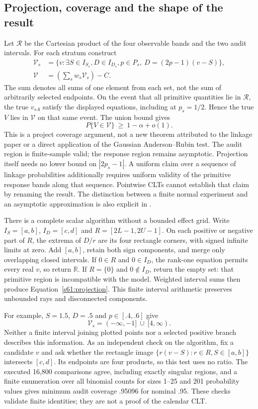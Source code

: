 \subsection{Projection, coverage and the shape of the result}
Let $\mathcal R$ be the Cartesian product of the four observable bands and
the two audit intervals. For each stratum construct
\begin{align}
 \mathcal V_s&=\{v:\exists S\in I_{S_s},D\in I_{D_s},p\in P_s,
                         \ D=(2p-1)(v-S)\},\nonumber\\
 \mathcal V&=\left(\sum_s w_s\mathcal V_s\right)-C.
 \label{s61:projection}
\end{align}
The sum denotes all sums of one element from each set, not the sum of
arbitrarily selected endpoints. On the event that all primitive quantities
lie in $\mathcal R$, the true $v_{sA}$ satisfy the displayed equations,
including at $p_s=1/2$. Hence the true $V$ lies in $\mathcal V$ on that
same event. The union bound gives
\[
 P\{V\in\mathcal V\}\ \ge\ 1-\alpha+o(1).
\]
This is a project coverage argument, not a new theorem attributed to the
linkage paper or a direct application of the Gaussian Anderson--Rubin test.
The audit region is finite-sample valid; the response region remains
asymptotic. Projection itself needs no lower bound on $|2p_s-1|$.
A uniform claim over a sequence of linkage probabilities additionally
requires uniform validity of the primitive response bands along that
sequence. Pointwise CLTs cannot establish that claim by renaming the result.
The distinction between a finite normal experiment and an asymptotic
approximation is also explicit in
\citet[Section 2.5, equations (9)--(11)]{rambachan2023}.

There is a complete scalar algorithm without a bounded effect grid.
Write $I_S=[a,b]$, $I_D=[c,d]$ and
$R=[2L-1,2U-1]$. On each positive or negative part of $R$,
the extrema of $D/r$ are its four rectangle corners, with signed infinite
limits at zero. Add $[a,b]$, retain both sign components, and merge only
overlapping closed intervals. If $0\in R$ and $0\in I_D$, the rank-one
equation permits every real $v$, so return $\mathbb R$. If $R=\{0\}$
and $0\notin I_D$, return the empty set: that primitive region is
incompatible with the model. Weighted interval sums then produce
Equation~\eqref{s61:projection}. This finite interval arithmetic preserves
unbounded rays and disconnected components.

For example, $S=1.5$, $D=.5$ and $p\in[.4,.6]$ give
\[
 \mathcal V_s=(-\infty,-1]\ \cup\ [4,\infty).
\]
Neither a finite interval joining plotted points nor a selected positive
branch describes this information. As an independent check on the algorithm,
fix a candidate $v$ and ask whether the rectangle image
$\{r(v-S):r\in R,S\in[a,b]\}$ intersects $[c,d]$.
Its endpoints are four products, so this test uses no ratio. The executed
16,800 comparisons agree, including exactly singular regions, and a finite
enumeration over all binomial counts for sizes 1--25 and 201 probability
values gives minimum audit coverage .95096 for nominal .95. These checks
validate finite identities; they are not a proof of the calendar CLT.

